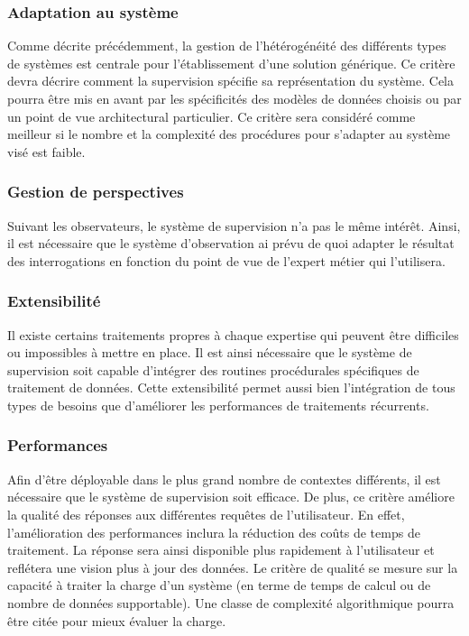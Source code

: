 \subsubsection{Adaptation au système}\label{sec:rw:supervision:criteres:adaptation}
Comme décrite précédemment, la gestion de l'hétérogénéité des différents types de systèmes est centrale pour l'établissement d'une solution générique. Ce critère devra décrire comment la supervision spécifie sa représentation du système. Cela pourra être mis en avant par les spécificités des modèles de données choisis ou par un point de vue architectural particulier. Ce critère sera considéré comme meilleur si le nombre et la complexité des procédures pour s'adapter au système visé est faible.

\subsubsection{Gestion de perspectives}
Suivant les observateurs, le système de supervision n'a pas le même intérêt. Ainsi, il est nécessaire que le système d'observation ai prévu de quoi adapter le résultat des interrogations en fonction du point de vue de l'expert métier qui l'utilisera.

\subsubsection{Extensibilité}
Il existe certains traitements propres à chaque expertise qui peuvent être difficiles ou impossibles à mettre en place. Il est ainsi nécessaire que le système de supervision soit capable d'intégrer des routines procédurales spécifiques de traitement de données. Cette extensibilité permet aussi bien l'intégration de tous types de besoins que d'améliorer les performances de traitements récurrents.

\subsubsection{Performances}
Afin d'être déployable dans le plus grand nombre de contextes différents, il est nécessaire que le système de supervision soit efficace. De plus, ce critère améliore la qualité des réponses aux différentes requêtes de l'utilisateur. En effet, l'amélioration des performances inclura la réduction des coûts de temps de traitement. La réponse sera ainsi disponible plus rapidement à l'utilisateur et reflétera une vision plus à jour des données. Le critère de qualité se mesure sur la capacité à traiter la charge d'un système (en terme de temps de calcul ou de nombre de données supportable). Une classe de complexité algorithmique pourra être citée pour mieux évaluer la charge.
